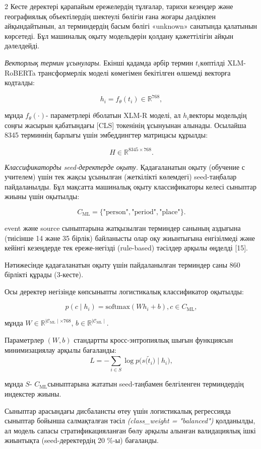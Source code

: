 \begin{multicols}{2}
Кесте деректері қарапайым ережелердің тұлғалар, тарихи кезеңдер және
географиялық объектілердің шектеулі бөлігін ғана жоғары дәлдікпен
айқындайтынын, ал терминдердің басым бөлігі «unknown» санатында
қалатынын көрсетеді. Бұл машиналық оқыту модельдерін қолдану
қажеттілігін айқын дәлелдейді.

\emph{Векторлық термин ұсынулары}. Екінші қадамда әрбір термин
\(t_{i}\)көптілді XLM-RoBERTa трансформерлік моделі көмегімен бекітілген
өлшемді векторға кодталды:

\[h_{i} = f_{\theta}(t_{i}) \in \mathbb{R}^{768},\]

мұнда \(f_{\theta}( \cdot )\)- параметрлері \(\theta\)болатын XLM-R
моделі, ал \(h_{i}\)векторы модельдің соңғы жасырын қабатындағы
{[}CLS{]} токенінің ұсынуынан алынады. Осылайша 8345 терминнің барлығы
үшін эмбеддингтер матрицасы құрылды:

\[H \in \mathbb{R}^{8345 \times 768}.\]

\emph{Классификаторды seed-деректерде оқыту.} Қадағаланатын оқыту
(обучение с учителем) үшін тек жақсы ұсынылған (жеткілікті көлемдегі)
seed-таңбалар пайдаланылды. Бұл мақсатта машиналық оқыту классификаторы
келесі сыныптар жиыны үшін оқытылды:

\[C_{\text{ML}} = \{\text{"person"},\text{"period"},\text{"place"}\}.\]

event және source сыныптарына жатқызылған терминдер санының аздығына
(тиісінше 14 және 35 бірлік) байланысты олар оқу жиынтығына енгізілмеді
және кейінгі кезеңдерде тек ереже-негізді (rule-based) тәсілдер арқылы
өңделді {[}15{]}.~

Нәтижесінде қадағаланатын оқыту үшін пайдаланылған терминдер саны 860
бірлікті құрады (3-кесте).

Осы деректер негізінде көпсыныпты логистикалық классификатор оқытылды:

\[p(c \mid h_{i}) = \text{softmax}(Wh_{i} + b),c \in C_{\text{ML}},\]

мұнда
\(W \in \mathbb{R}^{\mid \mathcal{C}_{\text{ML}} \mid \times 768}\),
\(b \in \mathbb{R}^{\mid \mathcal{C}_{\text{ML}} \mid}\).

Параметрлер \((W,b)\) стандартты кросс-энтропиялық шығын функциясын
минимизациялау арқылы бағаланды:
\vspace{-1em}
\[L = -\sum_{i \in S}^{}{\log p(s(}{\widetilde{t}}_{i}) \mid h_{i}),\]

мұнда \(S\)- \(C_{\text{ML}}\)сыныптарына жататын seed-таңбамен
белгіленген терминдердің индекстер жиыны.

Сыныптар арасындағы дисбалансты өтеу үшін логистикалық регрессияда
сыныптар бойынша салмақталған тәсіл \emph{(class\_weight = "balanced")}
қолданылды, ал модель сапасы стратификацияланған бөлу арқылы алынған
валидациялық ішкі жиынтықта (seed-деректердің 20 \%-ы) бағаланды.
\end{multicols}

